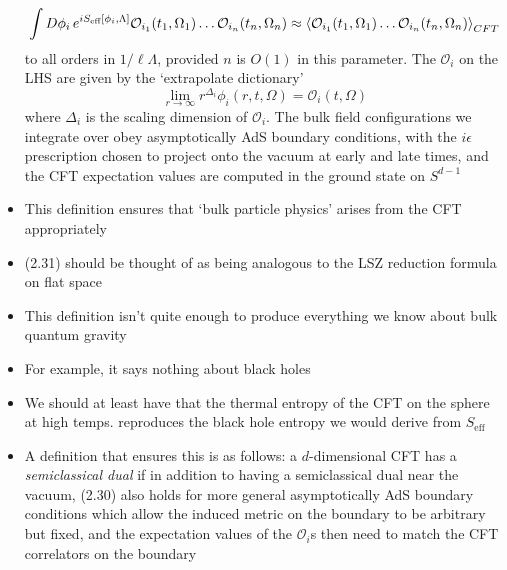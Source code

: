 \documentclass[12pt,a4paper]{article}
\numberwithin{equation}{section}
\begin{document}
\begin{itemize}
		\begin{equation}
			\int D\phi_{i}\,e^{iS_{\text{eff}}[\phi_{i},\Lambda]}\mathcal{O}_{i_{1}}(t_{1},\Omega_{1})\ldots\mathcal{O}_{i_{n}}(t_{n},\Omega_{n})\approx\braket{\mathcal{O}_{i_{1}}(t_{1},\Omega_{1})\ldots\mathcal{O}_{i_{n}}(t_{n},\Omega_{n})}_{CFT}
		\end{equation}
		to all orders in $1/\ell\Lambda$, provided $n$ is $O(1)$ in this parameter. The $\mathcal{O}_{i}$ on the LHS are given by the `extrapolate dictionary'
		\begin{equation}
			\lim_{r\to\infty}r^{\Delta_{i}}\phi_{i}(r,t,\Omega)=\mathcal{O}_{i}(t,\Omega)
		\end{equation}
		where $\Delta_{i}$ is the scaling dimension of $\mathcal{O}_{i}$. The bulk field configurations we integrate over obey asymptotically AdS boundary conditions, with the $i\epsilon$ prescription chosen to project onto the vacuum at early and late times, and the CFT expectation values are computed in the ground state on $S^{d-1}$
		\item This definition ensures that `bulk particle physics' arises from the CFT appropriately
		\item (2.31) should be thought of as being analogous to the LSZ reduction formula on flat space
		\item This definition isn't quite enough to produce everything we know about bulk quantum gravity
		\item For example, it says nothing about black holes
		\item We should at least have that the thermal entropy of the CFT on the sphere at high temps. reproduces the black hole entropy we would derive from $S_{\text{eff}}$
		\item A definition that ensures this is as follows: a $d$-dimensional CFT has a \textit{semiclassical dual} if in addition to having a semiclassical dual near the vacuum, (2.30) also holds for more general asymptotically AdS boundary conditions which allow the induced metric on the boundary to be arbitrary but fixed, and the expectation values of the $\mathcal{O}_{i}$s then need to match the CFT correlators on the boundary
	\end{itemize}
\end{document}
